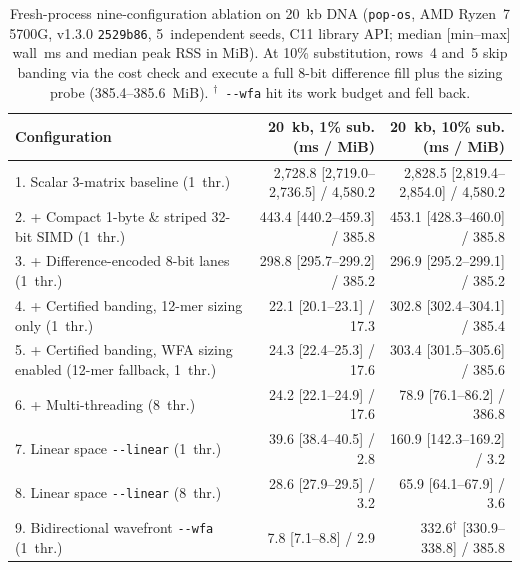 \documentclass[11pt,a4paper]{article}
\begin{document}
\begin{table}[t]
\centering
\caption{Fresh-process nine-configuration ablation on 20~kb DNA (\texttt{pop-os}, AMD Ryzen~7 5700G, v1.3.0 \texttt{2529b86}, 5~independent seeds, C11 library API; median [min--max] wall~ms and median peak RSS in MiB). At 10\% substitution, rows~4 and~5 skip banding via the cost check and execute a full 8-bit difference fill plus the sizing probe (385.4--385.6~MiB). $^{\dagger}$~\texttt{-{}-wfa} hit its work budget and fell back.}
\label{tab:ablation}
\footnotesize
\begin{tabular}{@{}lrr@{}}
\toprule
Configuration & 20~kb, 1\% sub. (ms / MiB) & 20~kb, 10\% sub. (ms / MiB) \\
\midrule
1. Scalar 3-matrix baseline (1~thr.) & 2,728.8 [2,719.0--2,736.5] / 4,580.2 & 2,828.5 [2,819.4--2,854.0] / 4,580.2 \\
2. + Compact 1-byte \& striped 32-bit SIMD (1~thr.) & 443.4 [440.2--459.3] / 385.8 & 453.1 [428.3--460.0] / 385.8 \\
3. + Difference-encoded 8-bit lanes (1~thr.) & 298.8 [295.7--299.2] / 385.2 & 296.9 [295.2--299.1] / 385.2 \\
4. + Certified banding, 12-mer sizing only (1~thr.) & 22.1 [20.1--23.1] / 17.3 & 302.8 [302.4--304.1] / 385.4 \\
5. + Certified banding, WFA sizing enabled (12-mer fallback, 1~thr.) & 24.3 [22.4--25.3] / 17.6 & 303.4 [301.5--305.6] / 385.6 \\
6. + Multi-threading (8~thr.) & 24.2 [22.1--24.9] / 17.6 & 78.9 [76.1--86.2] / 386.8 \\
7. Linear space \texttt{-{}-linear} (1~thr.) & 39.6 [38.4--40.5] / 2.8 & 160.9 [142.3--169.2] / 3.2 \\
8. Linear space \texttt{-{}-linear} (8~thr.) & 28.6 [27.9--29.5] / 3.2 & 65.9 [64.1--67.9] / 3.6 \\
9. Bidirectional wavefront \texttt{-{}-wfa} (1~thr.) & 7.8 [7.1--8.8] / 2.9 & 332.6$^{\dagger}$ [330.9--338.8] / 385.8 \\
\bottomrule
\end{tabular}
\end{table}
\end{document}
